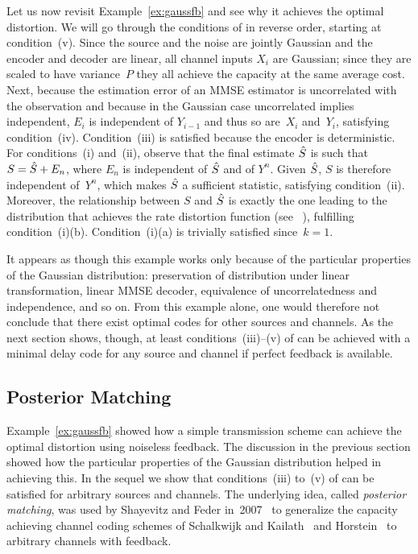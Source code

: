 Let us now revisit Example~\ref{ex:gaussfb} and see why it achieves the optimal
distortion. We will go through the conditions of 
in reverse order, starting at condition~(v). Since the source and the noise are
jointly Gaussian and the encoder and decoder are linear, all channel inputs
$X_i$ are Gaussian; since they are scaled to have variance~$P$ they all achieve
the capacity at the same average cost. Next, because the estimation error of an
MMSE estimator is uncorrelated with the observation and because in the Gaussian
case uncorrelated implies independent, $E_i$ is independent of $Y_{i-1}$ and
thus so are~$X_i$ and~$Y_i$, satisfying condition~(iv). Condition~(iii) is
satisfied because the encoder is deterministic. For conditions~(i) and~(ii),
observe that the final estimate ${\hat{S}}$ is such that $S = {\hat{S}} + E_n$, where $E_n$
is independent of ${\hat{S}}$ and of $Y^n$. Given ${\hat{S}}$, $S$ is therefore independent
of~$Y^n$, which makes ${\hat{S}}$ a sufficient statistic, satisfying condition~(ii).
Moreover, the relationship between $S$ and ${\hat{S}}$ is exactly the one leading to
the distribution that achieves the rate distortion function (see
\eg~\cite[Theorem~10.3.2]{CoverT1991}), fulfilling condition~(i)(b).
Condition~(i)(a) is trivially satisfied since~$k=1$.

It appears as though this example works only because of the particular
properties of the Gaussian distribution: preservation of distribution under
linear transformation, linear MMSE decoder, equivalence of uncorrelatedness and
independence, and so on. From this example alone, one would therefore not
conclude that there exist optimal codes for other sources and channels. As the
next section shows, though, at least conditions~(iii)--(v) of 
can be achieved with a minimal delay code for any source and channel if perfect
feedback is available.


\subsection{Posterior Matching}

Example~\ref{ex:gaussfb} showed how a simple transmission scheme can achieve the
optimal distortion using noiseless feedback. The discussion in the previous
section showed how the particular properties of the Gaussian distribution helped
in achieving this. In the sequel we show that conditions~(iii) to~(v) of
 can be satisfied for arbitrary sources and channels. The
underlying idea, called \emph{posterior matching}, was used by Shayevitz and
Feder in~2007~\cite{ShayevitzF2007,ShayevitzF2008} to generalize the capacity
achieving channel coding schemes of Schalkwijk and
Kailath~\cite{SchalkwijkK1966} and Horstein~\cite{Horstein1963} to arbitrary
channels with feedback.

